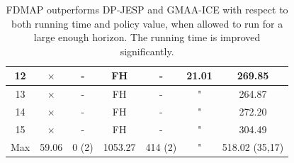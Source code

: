\documentclass[letterpaper]{article} %
\theoremstyle{definition}
\begin{document}
\begin{table}
{\begin{tabular}{||c|c|c|c|c|c|c||}
         \hline
         12 & $\times$ & - & FH & - & 21.01 & 269.85 \\
        \hline
         13 & $\times$ & - & FH & - & " & 264.87 \\
        \hline
         14 & $\times$ & - & FH & - & " & 272.20 \\
        \hline
         15 & $\times$ & - & FH & - & " & 304.49 \\
        \hline
         Max& 59.06 & 0 (2) & 1053.27 & 414 (2) & " & 518.02 (35,17) \\
         \hline
    \end{tabular}
    }
    \caption{\label{tbl:scale} FDMAP outperforms DP-JESP and GMAA-ICE with respect to both running time and policy value, when allowed to run for a large enough horizon. The running time is improved significantly.}
\end{table}


\begin{table}
\centering
\scriptsize
    \caption{\label{tbl:maxres} Results for the largest scaled problems, which only FDMAP managed to solve. Running times are rapidly increasing while reaching the scales limit of the underlying POMDP solver. The policies are still very robust, and reach the goal state in most cases. (\%Wins) }
\end{table}
\end{document}
